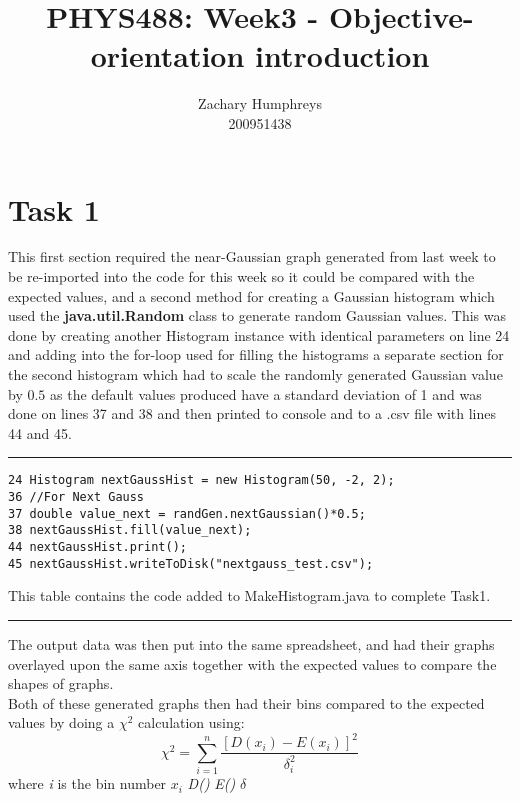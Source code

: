 \documentclass{article}
\title{PHYS488: Week3 - Objective-orientation introduction}
\author{Zachary Humphreys \\ 200951438}
\begin{document}
	\maketitle
	\begin{abstract}
		\begin{center}
		\textit{}
		\end{center}
	\end{abstract}
\section{Task 1}
This first section required the near-Gaussian graph generated from last week to be re-imported into the code for this week so it could be compared with the expected values, and a second method for creating a Gaussian histogram which used the \textbf{java.util.Random} class to generate random Gaussian values. This was done by creating another Histogram instance with identical parameters on line 24 and adding into the for-loop used for filling the histograms a separate section for the second histogram which had to scale the randomly generated Gaussian value by $0.5$ as the default values produced have a standard deviation of 1 and was done on lines 37 and 38 and then printed to console and to a .csv file with lines 44 and 45.
\begin{table}[b]
	\hrule
	\begin{lstlisting}
24 Histogram nextGaussHist = new Histogram(50, -2, 2); 
36 //For Next Gauss                             
37 double value_next = randGen.nextGaussian()*0.5;
38 nextGaussHist.fill(value_next);
44 nextGaussHist.print();                            
45 nextGaussHist.writeToDisk("nextgauss_test.csv");
	\end{lstlisting}
	\caption{This table contains the code added to MakeHistogram.java to complete Task1.}
	\hrule
\end{table}
The output data was then put into the same spreadsheet, and had their graphs overlayed upon the same axis together with the expected values to compare the shapes of graphs. \\ \indent Both of these generated graphs then had their bins compared to the expected values by doing a $\chi^2$ calculation using:
\begin{equation}
\chi^2 = \sum_{i=1}^{n} \dfrac{[D(x_i) - E(x_i)]^2}{\delta_{i}^{2}}
\end{equation} 
where \textit{i} is the bin number \textit{$x_i$} \textit{D()} \textit{E()} \textit{$\delta$}
\end{document}
